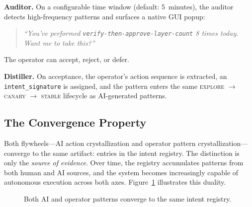 \documentclass[11pt,a4paper]{article}
\begin{document}
\textbf{Auditor.}
On a configurable time window (default: 5~minutes), the auditor detects high-frequency patterns and surfaces
a native GUI popup:
\begin{quote}
  \emph{``You've performed \texttt{verify-then-approve-layer-count} 8 times today. Want me to take this?''}
\end{quote}
The operator can accept, reject, or defer.

\textbf{Distiller.}
On acceptance, the operator's action sequence is extracted, an \texttt{intent\_signature} is assigned,
and the pattern enters the same \textsc{explore} $\to$ \textsc{canary} $\to$ \textsc{stable} lifecycle
as AI-generated patterns.

\subsection{The Convergence Property}

Both flywheels---AI action crystallization and operator pattern crystallization---converge to the same
artifact: entries in the intent registry.
The distinction is only the \emph{source of evidence}.
Over time, the registry accumulates patterns from both human and AI sources,
and the system becomes increasingly capable of autonomous execution across both axes.
Figure~\ref{fig:convergence} illustrates this duality.

\begin{figure}[h]
\centering
{}
\caption{Both AI and operator patterns converge to the same intent registry.}
\label{fig:convergence}
\end{figure}
\end{document}
